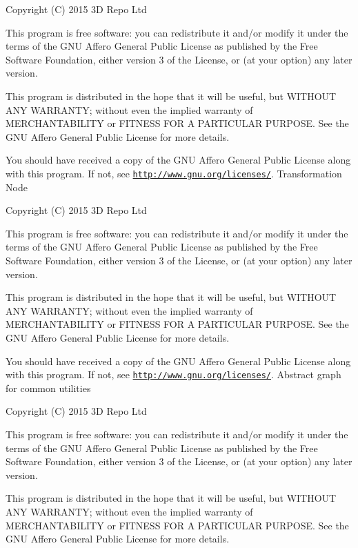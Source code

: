 Copyright (C) 2015 3\+D Repo Ltd

This program is free software\+: you can redistribute it and/or modify it under the terms of the G\+N\+U Affero General Public License as published by the Free Software Foundation, either version 3 of the License, or (at your option) any later version.

This program is distributed in the hope that it will be useful, but W\+I\+T\+H\+O\+U\+T A\+N\+Y W\+A\+R\+R\+A\+N\+T\+Y; without even the implied warranty of M\+E\+R\+C\+H\+A\+N\+T\+A\+B\+I\+L\+I\+T\+Y or F\+I\+T\+N\+E\+S\+S F\+O\+R A P\+A\+R\+T\+I\+C\+U\+L\+A\+R P\+U\+R\+P\+O\+S\+E. See the G\+N\+U Affero General Public License for more details.

You should have received a copy of the G\+N\+U Affero General Public License along with this program. If not, see \href{http://www.gnu.org/licenses/}{\tt http\+://www.\+gnu.\+org/licenses/}. Transformation Node

Copyright (C) 2015 3\+D Repo Ltd

This program is free software\+: you can redistribute it and/or modify it under the terms of the G\+N\+U Affero General Public License as published by the Free Software Foundation, either version 3 of the License, or (at your option) any later version.

This program is distributed in the hope that it will be useful, but W\+I\+T\+H\+O\+U\+T A\+N\+Y W\+A\+R\+R\+A\+N\+T\+Y; without even the implied warranty of M\+E\+R\+C\+H\+A\+N\+T\+A\+B\+I\+L\+I\+T\+Y or F\+I\+T\+N\+E\+S\+S F\+O\+R A P\+A\+R\+T\+I\+C\+U\+L\+A\+R P\+U\+R\+P\+O\+S\+E. See the G\+N\+U Affero General Public License for more details.

You should have received a copy of the G\+N\+U Affero General Public License along with this program. If not, see \href{http://www.gnu.org/licenses/}{\tt http\+://www.\+gnu.\+org/licenses/}. Abstract graph for common utilities

Copyright (C) 2015 3\+D Repo Ltd

This program is free software\+: you can redistribute it and/or modify it under the terms of the G\+N\+U Affero General Public License as published by the Free Software Foundation, either version 3 of the License, or (at your option) any later version.

This program is distributed in the hope that it will be useful, but W\+I\+T\+H\+O\+U\+T A\+N\+Y W\+A\+R\+R\+A\+N\+T\+Y; without even the implied warranty of M\+E\+R\+C\+H\+A\+N\+T\+A\+B\+I\+L\+I\+T\+Y or F\+I\+T\+N\+E\+S\+S F\+O\+R A P\+A\+R\+T\+I\+C\+U\+L\+A\+R P\+U\+R\+P\+O\+S\+E. See the G\+N\+U Affero General Public License for more details.

